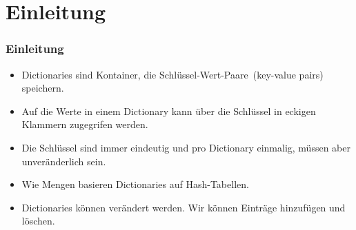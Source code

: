 \documentclass[aspectratio=169,mathserif,notheorems]{beamer}%
\subtitle{21.~Dictionaries bzw.\ Hash Maps}%
\begin{document}
%
%
\startPresentation%
%
\section{Einleitung}%
\begin{frame}[t]%
\frametitle{Einleitung}%
%
\begin{itemize}%
\item Dictionaries sind Kontainer, die Schlüssel-Wert-Paare~(key-value pairs) speichern.%
%
\item<2-> Auf die Werte in einem Dictionary kann über die Schlüssel in eckigen Klammern zugegrifen werden.%
%
\item<3-> Die Schlüssel sind immer eindeutig und pro Dictionary einmalig, müssen aber unveränderlich sein.%
%
\item<5-> Wie Mengen basieren Dictionaries auf Hash-Tabellen\cite{K1998SAS,CLRS2009ITA,SKS2019DSC}.
%
\item<6-> Dictionaries können verändert werden. Wir können Einträge hinzufügen und löschen.%
\end{itemize}%
%
%
%
\end{frame}%
%
%
\end{document}
